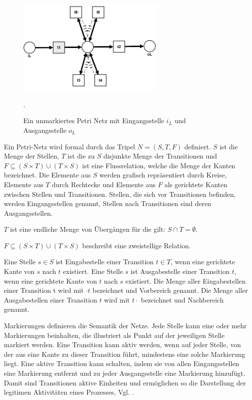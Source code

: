 \begin{figure}[!h]
    \centering
    \includegraphics[width=0.65\textwidth]{figures/Appbildungen/petriNetFlower.png}
    \caption{Ein unmarkiertes Petri Netz mit Eingangsstelle $i_L$ und Ausgangsstelle $o_L$}.
    \label{fig:exampleFlower}
\end{figure}
Ein Petri-Netz wird formal durch das Tripel $N = (S, T, F)$ definiert. $S$ ist die Menge der Stellen, $T$  ist  die  zu  $S$  disjunkte  Menge  der  Transitionen  und  $F⊆ (S ×  T) ∪ (T  ×  S) $ ist  eine Flussrelation,  welche  die  Menge  der  Kanten  bezeichnet.  Die  Elemente  aus  $S$  werden grafisch repräsentiert durch Kreise, Elemente aus $T$ durch Rechtecke und Elemente aus $F$ als gerichtete Kanten zwischen Stellen und Transitionen. Stellen,  die  sich  vor  Transitionen  befinden, werden Eingangsstellen genannt, Stellen nach Transitionen sind deren Ausgangsstellen. 

$T$ ist eine endliche Menge von Übergängen für die gilt: $S ∩ T =  ∅.$

$F ⊆(S × T) ∪ (T × S)$ beschreibt eine zweistellige Relation.

Eine  Stelle  $s∈S$  ist  Eingabestelle  einer  Transition  $t∈T$,  wenn  eine  gerichtete  Kante  von $s$ nach $t$ existiert. Eine Stelle $s$ ist Ausgabestelle einer Transition $ t$, wenn eine gerichtete Kante von $t$ nach $s$ existiert. Die Menge aller Eingabestellen einer Transition t wird mit $\cdot t$ bezeichnet und Vorbereich genannt. Die Menge aller Ausgabestellen einer Transition $t$ wird mit $t \cdot$ bezeichnet und Nachbereich genannt.

Markierungen definieren die Semantik der Netze. Jede Stelle kann eine oder mehr Markierungen beinhalten, die illustriert als Punkt auf der jeweiligen Stelle markiert werden. Eine Transition kann aktiv werden, wenn auf jeder Stelle, von der aus eine Kante zu dieser Transition führt, mindestens eine solche Markierung liegt. Eine aktive Transition kann schalten, indem sie von allen Eingangsstellen eine Markierung entfernt und zu jeder Ausgangsstelle eine Markierung hinzufügt. Damit sind Transitionen aktive Einheiten und ermöglichen so die Darstellung der legitimen Aktivitäten eines Prozesses, Vgl. \cite{Petrinetze}.
\newpage
